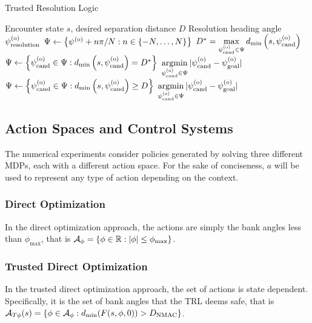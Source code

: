 \renewcommand{\algorithmicrequire}{\textbf{Input:}}
\renewcommand{\algorithmicensure}{\textbf{Output:}}
\begin{algorithm}[tb]
    \caption{Trusted Resolution Logic}\label{alg:trl}
\begin{algorithmic}
    \Require Encounter state $s$, desired separation distance $D$
    \Ensure Resolution heading angle $\psi^{(\mathrm{o})}_\mathrm{resolution}$
        \State $\Psi \gets \left\{\psi^{(\mathrm{o})} + n\pi/N : n \in \{-N,\ldots,N\} \right\}$
        \State $D^* = \underset{\psi^{(\mathrm{o})}_{\mathrm{cand}} \in \Psi}{\max}\, d_\text{min}\left(s, \psi^{(\mathrm{o})}_{\mathrm{cand}}\right)$
         
            \State $\Psi \gets \left\{\psi^{(\mathrm{o})}_{\mathrm{cand}} \in \Psi : d_\text{min}\left(s, \psi^{(\mathrm{o})}_{\mathrm{cand}}\right) = D^*\right\}$
            \State \Return $\underset{\psicand \in \Psi}{\argmin}\,|\psicand-\psigoal|$
        \Else
            \State $\Psi \gets \left\{\psi^{(\mathrm{o})}_{\mathrm{cand}} \in \Psi : d_\text{min}\left(s, \psi^{(\mathrm{o})}_{\mathrm{cand}}\right) \geq D\right\}$
            \State \Return $\underset{\psicand \in \Psi}{\argmin}\,|\psicand-\psigoal|$
        \EndIf
    \EndFunction
\end{algorithmic}
\end{algorithm}


\subsection{Action Spaces and Control Systems}\label{sec:aspaces}

The numerical experiments consider policies generated by solving three different MDPs, each with a different action space. 
For the sake of conciseness, $a$ will be used to represent any type of action depending on the context.

\subsubsection{Direct Optimization}

In the direct optimization approach, the actions are simply the bank angles less than $\phi_\text{max}$, that is ${\mathcal{A}}_\phi = \left\{\phi \in \mathbb{R}: |\phi| \leq \phi_\text{max} \right\}$.

\subsubsection{Trusted Direct Optimization}

In the trusted direct optimization approach, the set of actions is state dependent.
Specifically, it is the set of bank angles that the TRL deems safe, that is ${\mathcal{A}}_{T\phi}(s) = \left\{\phi \in {\ensuremath{\mathcal{A}}}_\phi: d_\text{min}(F(s, \phi, 0)) > D_\text{NMAC} \right\}$.

